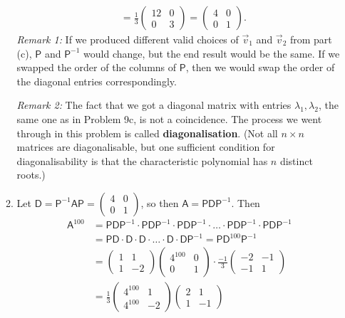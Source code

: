 \begin{enumerate}
\begin{enumerate}
\begin{align*}
&= \frac{1}{3}\begin{pmatrix} 12 & 0 \\ 0 & 3 \end{pmatrix} = \begin{pmatrix} 4 & 0 \\ 0 & 1 \end{pmatrix}.
\end{align*}
\textit{Remark 1:} If we produced different valid choices of $\vec{v}_1$ and $\vec{v}_2$ from part (c), $\mathsf{P}$ and $\mathsf{P}^{-1}$ would change, but the end result would be the same. If we swapped the order of the columns of $\mathsf{P}$, then we would swap the order of the diagonal entries correspondingly.\par
\textit{Remark 2:} The fact that we got a diagonal matrix with entries $\lambda_1, \lambda_2$, the same one as in Problem 9c, is not a coincidence. The process we went through in this problem is called \textbf{diagonalisation}. (Not all $n\times n$ matrices are diagonalisable, but one sufficient condition for diagonalisability is that the characteristic polynomial has $n$ distinct roots.)
\item Let $\mathsf{D} = \mathsf{P}^{-1}\mathsf{AP} = \begin{pmatrix} 4 & 0 \\ 0 & 1 \end{pmatrix}$, so then $\mathsf{A} = \mathsf{PDP}^{-1}$. Then
\begin{align*}
\mathsf{A}^{100} &= \mathsf{PDP}^{-1}\cdot\mathsf{PDP}^{-1}\cdot\mathsf{PDP}^{-1}\cdot\ldots\cdot\mathsf{PDP}^{-1}\cdot\mathsf{PDP}^{-1} \\
&= \mathsf{PD}\cdot\mathsf{D}\cdot\mathsf{D}\cdot\ldots\cdot\mathsf{D}\cdot\mathsf{DP}^{-1} = \mathsf{PD}^{100}\mathsf{P}^{-1} \\
&= \begin{pmatrix} 1 & 1 \\ 1 & -2 \end{pmatrix}\begin{pmatrix} 4^{100} & 0 \\ 0 & 1 \end{pmatrix}\cdot\frac{-1}{3}\begin{pmatrix} -2 & -1 \\ -1 & 1 \end{pmatrix} \\
&= \frac{1}{3}\begin{pmatrix} 4^{100} & 1 \\ 4^{100} & -2 \end{pmatrix}\begin{pmatrix} 2 & 1 \\ 1 & -1 \end{pmatrix} \\

\end{align*}
\end{enumerate}
\end{enumerate}
